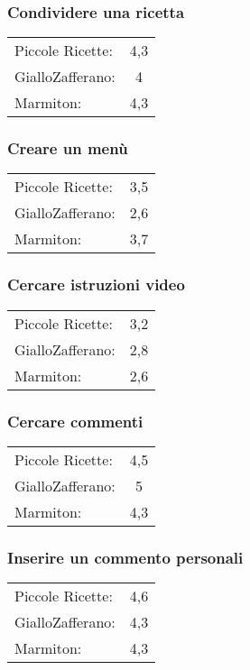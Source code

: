 \subsubsection{Condividere una ricetta}
\begin{tabular}{l c}
Piccole Ricette: & 4,3\\
GialloZafferano: & 4\\
Marmiton: & 4,3\\
\end{tabular}

\subsubsection{Creare un menù}
\begin{tabular}{l c}
Piccole Ricette: & 3,5\\
GialloZafferano: & 2,6\\
Marmiton: & 3,7\\
\end{tabular}

\subsubsection{Cercare istruzioni video}
\begin{tabular}{l c}
Piccole Ricette: & 3,2\\
GialloZafferano: & 2,8\\
Marmiton: & 2,6\\
\end{tabular}

\subsubsection{Cercare commenti}
\begin{tabular}{l c}
Piccole Ricette: & 4,5\\
GialloZafferano: & 5\\
Marmiton: & 4,3\\
\end{tabular}

\subsubsection{Inserire un commento personali}
\begin{tabular}{l c}
Piccole Ricette: & 4,6\\
GialloZafferano: & 4,3\\
Marmiton: & 4,3\\
\end{tabular}

